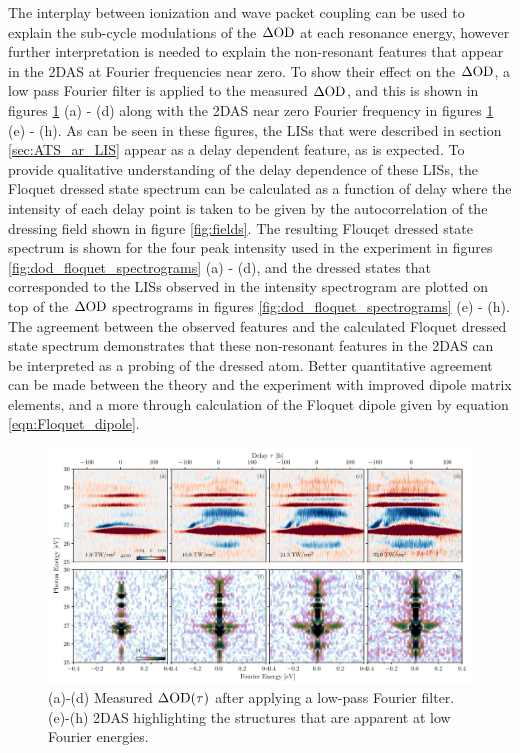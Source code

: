 The interplay between ionization and wave packet coupling can be used to explain the sub-cycle modulations of the $\dod$ at each resonance energy, however further interpretation is needed to explain the non-resonant features that appear in the 2DAS at Fourier frequencies near zero.  To show their effect on the $\dod$, a low pass Fourier filter is applied to the measured $\dod$, and this is shown in figures \ref{fig:dod_fft_lp_spectrograms} (a) - (d) along with the 2DAS near zero Fourier frequency in figures \ref{fig:dod_fft_lp_spectrograms} (e) - (h).  As can be seen in these figures, the LISs that were described in section \ref{sec:ATS_ar_LIS} appear as a delay dependent feature, as is expected.  To provide qualitative understanding of the delay dependence of these LISs, the Floquet dressed state spectrum can be calculated as a function of delay where the intensity of each delay point is taken to be given by the autocorrelation of the dressing field shown in figure \ref{fig:fields}.  The resulting Flouqet dressed state spectrum is shown for the four peak intensity used in the experiment in figures \ref{fig:dod_floquet_spectrograms} (a) - (d), and the dressed states that corresponded to the LISs observed in the intensity spectrogram are plotted on top of the $\dod$ spectrograms in figures \ref{fig:dod_floquet_spectrograms} (e) - (h).  The agreement between the observed features and the calculated Floquet dressed state spectrum demonstrates that these non-resonant features in the 2DAS can be interpreted as a probing of the dressed atom.  Better quantitative agreement can be made between the theory and the experiment with improved dipole matrix elements, and a more through calculation of the Floquet dipole given by equation \ref{eqn:Floquet_dipole}. 


\begin{figure}%
	\includegraphics[width=\textwidth]{figures/ATS/dod_fft_lp_spectrograms.pdf}
	\caption[Delay dependent $\dod$ after applying a low-pass Fourier filter]{(a)-(d) Measured $\Delta\mathrm{OD}(\tau)$ after applying a low-pass Fourier filter. (e)-(h) 2DAS highlighting the structures that are apparent at low Fourier energies.}
	\label{fig:dod_fft_lp_spectrograms}
\end{figure}

